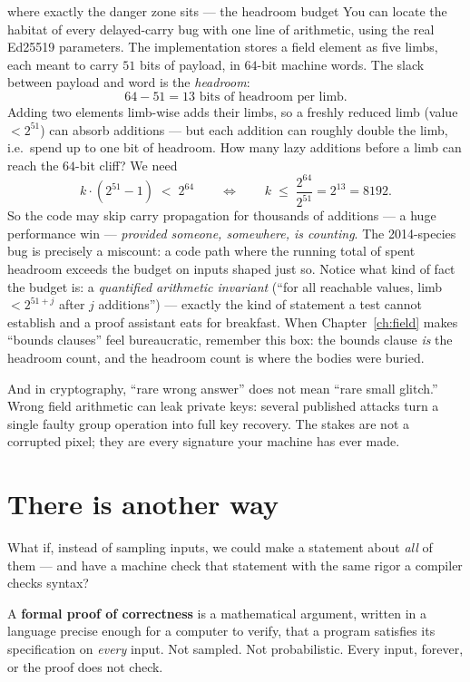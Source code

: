 \begin{worked}{where exactly the danger zone sits --- the headroom budget}
You can locate the habitat of every delayed-carry bug with one line of
arithmetic, using the real Ed25519 parameters. The implementation stores a
field element as five limbs, each meant to carry $51$ bits of payload, in
$64$-bit machine words. The slack between payload and word is the
\emph{headroom}:
\[
64 - 51 = 13 \text{ bits of headroom per limb.}
\]
Adding two elements limb-wise adds their limbs, so a freshly reduced limb
(value $< 2^{51}$) can absorb additions --- but each addition can roughly
double the limb, i.e.\ spend up to one bit of headroom. How many lazy
additions before a limb can reach the $64$-bit cliff? We need
\[
k \cdot (2^{51}-1) \;<\; 2^{64}
\qquad\Longleftrightarrow\qquad
k \;\le\; \frac{2^{64}}{2^{51}} = 2^{13} = 8192 .
\]
So the code may skip carry propagation for thousands of additions --- a huge
performance win --- \emph{provided someone, somewhere, is counting}. The
2014-species bug is precisely a miscount: a code path where the running
total of spent headroom exceeds the budget on inputs shaped just so. Notice
what kind of fact the budget is: a \emph{quantified arithmetic invariant}
(``for all reachable values, limb $< 2^{51+j}$ after $j$ additions'') ---
exactly the kind of statement a test cannot establish and a proof assistant
eats for breakfast. When Chapter~\ref{ch:field} makes ``bounds clauses''
feel bureaucratic, remember this box: the bounds clause \emph{is} the
headroom count, and the headroom count is where the bodies were buried.
\end{worked}

And in cryptography, ``rare wrong answer'' does not mean ``rare small
glitch.'' Wrong field arithmetic can leak private keys: several published
attacks turn a single faulty group operation into full key recovery. The
stakes are not a corrupted pixel; they are every signature your machine has
ever made.

\section{There is another way}

What if, instead of sampling inputs, we could make a statement about
\emph{all} of them --- and have a machine check that statement with the same
rigor a compiler checks syntax?

\begin{bigidea}
A \textbf{formal proof of correctness} is a mathematical argument, written in
a language precise enough for a computer to verify, that a program satisfies
its specification on \emph{every} input. Not sampled. Not probabilistic.
Every input, forever, or the proof does not check.
\end{bigidea}

